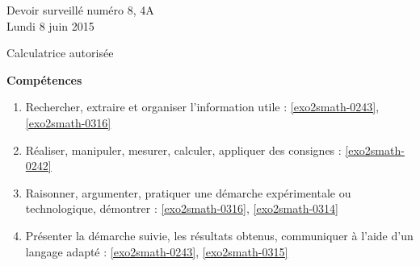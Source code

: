 \documentclass[a4paper,10pt]{article}
\begin{document}
\begin{feuilleDS}{Devoir surveillé numéro 8, 4A\\ \small Lundi 8 juin 2015}
    \begin{center}
        Calculatrice autorisée
    \end{center}


\vspace{1cm}
{\bf Compétences}
\small
\begin{enumerate}
    \item
        Rechercher, extraire et organiser l'information utile : \ref{exo2smath-0243}, \ref{exo2smath-0316}
    \item
        Réaliser, manipuler, mesurer, calculer, appliquer des consignes : \ref{exo2smath-0242}
    \item
        Raisonner, argumenter, pratiquer une démarche expérimentale ou technologique, démontrer : \ref{exo2smath-0316}, \ref{exo2smath-0314}
    \item 
        Présenter la démarche suivie, les résultats obtenus, communiquer à l'aide d’un langage adapté : \ref{exo2smath-0243}, \ref{exo2smath-0315}
\end{enumerate}
\end{feuilleDS}
\end{document}
